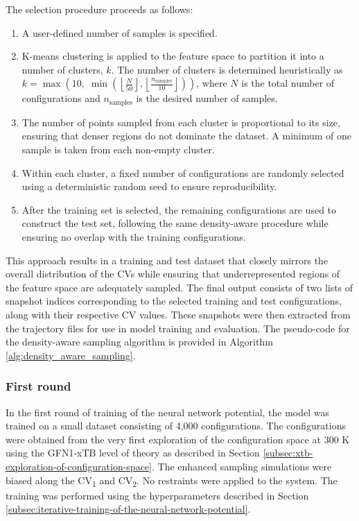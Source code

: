 The selection procedure proceeds as follows:
\begin{enumerate}
    \item A user-defined number of samples is specified.
    \item K-means clustering is applied to the feature space to partition it into a number of clusters, $k$. The number of clusters is determined heuristically as $k = \max\left(10, \; \min\left(\left\lfloor \frac{N}{50} \right\rfloor, \left\lfloor \frac{n_\text{samples}}{10} \right\rfloor \right)\right)$, where $N$ is the total number of configurations and $n_\text{samples}$ is the desired number of samples.
    \item The number of points sampled from each cluster is proportional to its size, ensuring that denser regions do not dominate the dataset. A minimum of one sample is taken from each non-empty cluster.
    \item Within each cluster, a fixed number of configurations are randomly selected using a deterministic random seed to ensure reproducibility.
    \item After the training set is selected, the remaining configurations are used to construct the test set, following the same density-aware procedure while ensuring no overlap with the training configurations.
\end{enumerate}

This approach results in a training and test dataset that closely mirrors the overall distribution of the CVs while ensuring that underrepresented regions of the feature space are adequately sampled. The final output consists of two lists of snapshot indices corresponding to the selected training and test configurations, along with their respective CV values. These snapshots were then extracted from the trajectory files for use in model training and evaluation. The pseudo-code for the density-aware sampling algorithm is provided in Algorithm \ref{alg:density_aware_sampling}.



\subsubsection{First round}
In the first round of training of the neural network potential, the model was trained on a small dataset consisting of 4,000 configurations. The configurations were obtained from the very first exploration of the configuration space at 300 K using the GFN1-xTB level of theory as described in Section \ref{subsec:xtb-exploration-of-configuration-space}. The enhanced sampling simulations were biased along the CV\textsubscript{1} and CV\textsubscript{2}. No restraints were applied to the system. The training was performed using the hyperparameters described in Section \ref{subsec:iterative-training-of-the-neural-network-potential}.



